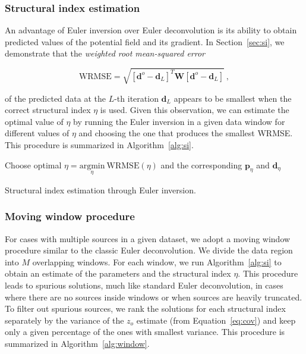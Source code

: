 \subsubsection{Structural index estimation}

An advantage of Euler inversion over Euler deconvolution is its ability to obtain
predicted values of the potential field and its gradient.
In Section~\ref{sec:si}, we demonstrate that the \textit{weighted root
mean-squared error} 

\begin{equation}
    \text{WRMSE} = \sqrt{\left[\mathbf{d}^o - \mathbf{d}_L\right]^T\mathbf{W}\left[\mathbf{d}^o - \mathbf{d}_L\right]} \ ,
    \label{eq:wrmse}
\end{equation}

\noindent
of the predicted data at the $L$-th iteration $\mathbf{d}_L$ 
appears to be smallest when the correct structural index $\eta$ is used.
Given this observation, we can estimate the optimal value of $\eta$ by running
the Euler inversion in a given data window for different values of $\eta$ and
choosing the one that produces the smallest WRMSE.
This procedure is summarized in Algorithm~\ref{alg:si}.

\begin{algorithm}[!h]
  Choose optimal $\eta = \underset{\eta}{\text{argmin}}\ \text{WRMSE}(\eta)$ and the corresponding
  $\mathbf{p}_{\eta}$ and $\mathbf{d}_{\eta}$
  \;
  \BlankLine
  \caption{Structural index estimation through Euler inversion.}
  \label{alg:si}
\end{algorithm}

\subsubsection{Moving window procedure}

For cases with multiple sources in a given dataset, we adopt a moving window
procedure similar to the classic Euler deconvolution.
We divide the data region into $M$ overlapping windows.
For each window, we run Algorithm~\ref{alg:si} to obtain an estimate of the
parameters and the structural index $\eta$.
This procedure leads to spurious solutions, much like standard Euler
deconvolution, in cases where there are no sources inside windows or when
sources are heavily truncated.
To filter out spurious sources, we rank the solutions for each structural index
separately by the variance of the $z_o$ estimate (from Equation~\ref{eq:cov})
and keep only a given percentage of the ones with smallest variance.
This procedure is summarized in Algorithm~\ref{alg:window}.

